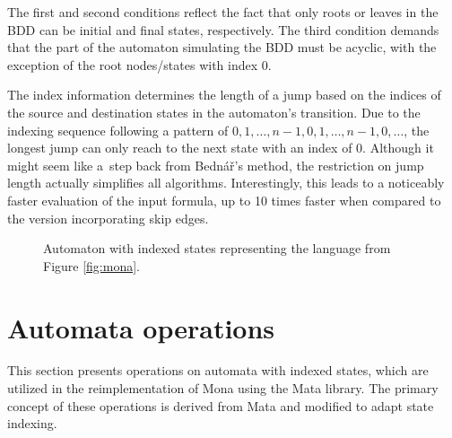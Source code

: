 \documentclass[pdflatex,sn-mathphys-num]{sn-jnl}%
\theoremstyle{thmstyleone}%
\theoremstyle{thmstyletwo}%
\theoremstyle{thmstylethree}%
\begin{document}
        The first and second conditions reflect the fact that only roots or leaves in the BDD can be initial and final states, respectively. The third condition demands that the part of the automaton simulating the BDD must be acyclic, with the exception of the root nodes/states with index 0.

        The index information determines the length of a jump based on the indices of the source and destination states in the automaton's transition. Due to the indexing sequence following a pattern of $0, 1, \dots, n-1, 0, 1, \dots, n-1, 0, \dots$, the longest jump can only reach to the next state with an index of $0$. Although it might seem like a~step back from Bednář's method, the restriction on jump length actually simplifies all algorithms. Interestingly, this leads to a noticeably faster evaluation of the input formula, up to 10 times faster when compared to the version incorporating skip edges.

        \begin{figure}[h]
            \centering
            \caption{Automaton with indexed states representing the language from Figure \ref{fig:mona}.}
        \end{figure}

\section{Automata operations}
    This section presents operations on automata with indexed states, which are utilized in the reimplementation of Mona using the Mata library. The primary concept of these operations is derived from Mata and modified to adapt state indexing.
\end{document}
